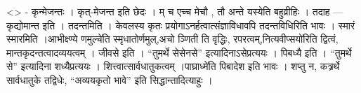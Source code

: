 \textless{}\textgreater{} - कृन्मेजन्तः । कृत्-मेजन्त इति छेदः । म् च
एच्च मेचौ , तौ अन्ते यस्येति बहुव्रीहिः । तदाह --- कृद्योमान्त इति ।
तदन्तमिति । केवलस्य कृतः प्रयोगाऽनर्हत्वात्संज्ञाविधावपि तदन्तविधिरिति
भावः । स्मारं स्मारमिति ।आभीक्ष्ण्ये णमुल्चे॑ति स्मृधातोर्णमुल्,अचो
ञ्णिती ति वृद्धिः, रपरत्वम्,नित्यवीप्सयो॑रिति द्वित्वं,
मान्तकृदन्तत्वादव्ययत्वम् । जीवसे इति । ``तुमर्थे सेसेनसे''
इत्यादिनाऽसेप्रत्ययः । पिबध्यै इति । ``तुमर्थे से'' इत्यादिना
शध्यैप्रत्ययः । शित्त्वात्सार्वधातुकत्वम् ।पाघ्राध्मे॑ति पिबादेश इति
भावः । शप्तु न, कत्र्रर्थे सार्वधातुके तद्विधेः, ``अव्ययकृतो भावे'' इति
सिद्धान्तादित्याहुः ।
